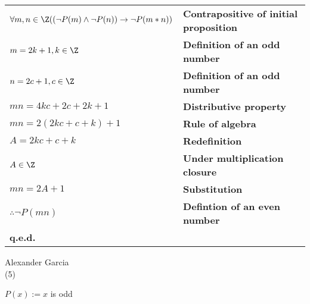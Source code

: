 \documentclass[]{article}
\def\AND{\wedge}
\def\imp{\rightarrow}
\begin{document}
\begin{tabular}{l l}

	$\forall m, n \in \Z ( (\neg P(m) \AND \neg P(n)) \imp \neg P(m*n) )$ & \textbf{Contrapositive of initial proposition}\\

	$m = 2k + 1, k \in \Z$ & \textbf{Definition of an odd number} \\

	$n = 2c + 1, c \in \Z$ & \textbf{Definition of an odd number} \\

	$mn = 4kc + 2c + 2k + 1$ & \textbf{Distributive property} \\

	$mn = 2(2kc + c + k) + 1$ & \textbf{Rule of algebra} \\
	
	$A = 2kc + c + k$ & \textbf{Redefinition} \\

	$A \in \Z$ & \textbf{Under multiplication closure} \\

	$mn = 2A + 1$ & \textbf{Substitution} \\

	$\therefore \neg P(mn)$ & \textbf{Defintion of an even number} \\

	\textbf{q.e.d.} \\

\end{tabular}

\newpage

Alexander Garcia \\

\noindent (5)

$P(x) := x$ is odd \\
\end{document}
